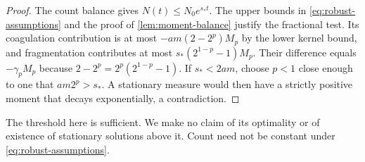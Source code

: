 \begin{proof}
The count balance gives $N(t)\leq N_0e^{s_*t}$. The upper bounds in
\eqref{eq:robust-assumptions} and the proof of
\cref{lem:moment-balance} justify the fractional test. Its coagulation
contribution is at most $-am(2-2^p)M_p$ by the lower kernel bound,
and fragmentation contributes at most $s_*(2^{1-p}-1)M_p$.
Their difference equals $-\gamma_pM_p$ because
$2-2^p=2^p(2^{1-p}-1)$.
If $s_*<2am$, choose $p<1$ close enough to one that $am2^p>s_*$.
A stationary measure would then have a strictly positive moment that
decays exponentially, a contradiction.
\end{proof}

The threshold here is sufficient. We make no claim of its optimality or
of existence of stationary solutions above it. Count need not be constant
under \eqref{eq:robust-assumptions}.
